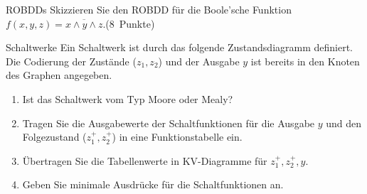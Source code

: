 \documentclass{article}
\begin{document}
\begin{exercise}{ROBDDs}
  Skizzieren Sie den ROBDD für die Boole’sche Funktion $f (x, y, z) = \overline{x \land y \land z}$.\hfill (8~Punkte)

  \begin{solution}
  \end{solution}
\end{exercise}

\begin{exercise}{Schaltwerke}
  Ein Schaltwerk ist durch das folgende Zustandsdiagramm definiert. Die Codierung der Zustände ($z_1, z_2$) und der Ausgabe $y$ ist bereits in den Knoten des Graphen angegeben.\par
  \centering
  \begin{enumerate}
    \item Ist das Schaltwerk vom Typ Moore oder Mealy?\points
    \item Tragen Sie die Ausgabewerte der Schaltfunktionen für die Ausgabe $y$ und den Folgezustand ($z_1^+, z_2^+$) in eine Funktionstabelle ein.\points[2]
    \item Übertragen Sie die Tabellenwerte in KV-Diagramme für $z_1^+, z_2^+, y$.\points[3]
    \item Geben Sie minimale Ausdrücke für die Schaltfunktionen an.\points[4]
  \end{enumerate}
\end{exercise}
\end{document}
